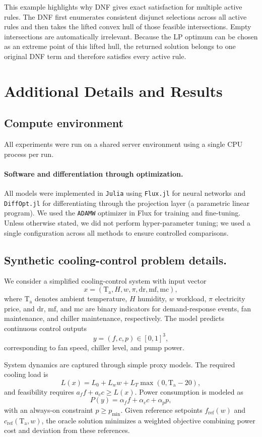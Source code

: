 \documentclass{article}
\theoremstyle{plain}
\theoremstyle{definition}
\theoremstyle{remark}
\begin{document}
This example highlights why DNF gives exact satisfaction for multiple active rules. The DNF first enumerates consistent disjunct selections across all active rules and then takes the lifted convex hull of those feasible intersections. Empty intersections are automatically irrelevant. Because the LP optimum can be chosen as an extreme point of this lifted hull, the returned solution belongs to one original DNF term and therefore satisfies every active rule.


\section{Additional Details and Results}

\subsection{Compute environment}
\label{app:compute}
All experiments were run on a shared server environment using a single CPU process per run. 

\paragraph{Software and differentiation through optimization.}
All models were implemented in \texttt{Julia} using \texttt{Flux.jl} for neural networks and \texttt{DiffOpt.jl} for differentiating through the projection layer (a parametric linear program). We used the \texttt{ADAMW} optimizer in Flux for training and fine-tuning. Unless otherwise stated, we did not perform hyper-parameter tuning; we used a single configuration across all methods to ensure controlled comparisons.


\subsection{Synthetic cooling-control problem details.}
\label{app:syn_details}
We consider a simplified cooling-control system with input vector
\[
x = (\mathrm{T_a}, H, w, \pi, \mathrm{dr}, \mathrm{mf}, \mathrm{mc}),
\]
where $\mathrm{T_a}$ denotes ambient temperature, $H$ humidity, $w$ workload, $\pi$ electricity price, and $\mathrm{dr}$, $\mathrm{mf}$, and $\mathrm{mc}$ are binary indicators for demand-response events, fan maintenance, and chiller maintenance, respectively.
The model predicts continuous control outputs
\[
y = (f, c, p) \in [0,1]^3,
\]
corresponding to fan speed, chiller level, and pump power.

System dynamics are captured through simple proxy models.
The required cooling load is
\[
L(x) = L_0 + L_w w + L_T \max(0, \mathrm{T_a} - 20),
\]
and feasibility requires $a_f f + a_c c \ge L(x)$.
Power consumption is modeled as
\[
P(y) = \alpha_f f + \alpha_c c + \alpha_p p,
\]
with an always-on constraint $p \ge p_{\min}$.
Given reference setpoints $f_{\mathrm{ref}}(w)$ and $c_{\mathrm{ref}}(\mathrm{T_a}, w)$, the oracle solution minimizes a weighted objective combining power cost and deviation from these references.
\end{document}
